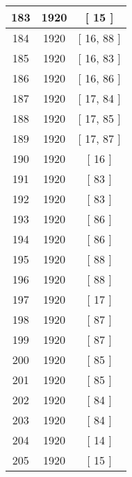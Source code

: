 \begin{center}
\begin{longtable}[H]{|| c c c ||}
\hline
183 & 1920 & [ 15 ] \\ 
\hline
184 & 1920 & [ 16, 88 ] \\ 
\hline
185 & 1920 & [ 16, 83 ] \\ 
\hline
186 & 1920 & [ 16, 86 ] \\ 
\hline
187 & 1920 & [ 17, 84 ] \\ 
\hline
188 & 1920 & [ 17, 85 ] \\ 
\hline
189 & 1920 & [ 17, 87 ] \\ 
\hline
190 & 1920 & [ 16 ] \\ 
\hline
191 & 1920 & [ 83 ] \\ 
\hline
192 & 1920 & [ 83 ] \\ 
\hline
193 & 1920 & [ 86 ] \\ 
\hline
194 & 1920 & [ 86 ] \\ 
\hline
195 & 1920 & [ 88 ] \\ 
\hline
196 & 1920 & [ 88 ] \\ 
\hline
197 & 1920 & [ 17 ] \\ 
\hline
198 & 1920 & [ 87 ] \\ 
\hline
199 & 1920 & [ 87 ] \\ 
\hline
200 & 1920 & [ 85 ] \\ 
\hline
201 & 1920 & [ 85 ] \\ 
\hline
202 & 1920 & [ 84 ] \\ 
\hline
203 & 1920 & [ 84 ] \\ 
\hline
204 & 1920 & [ 14 ] \\ 
\hline
205 & 1920 & [ 15 ] \\ 
\hline
\end{longtable}
\end{center}

